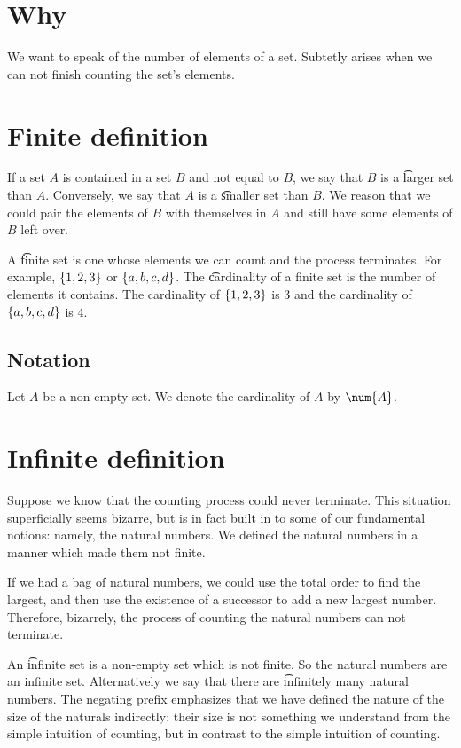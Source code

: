 

\section*{Why}

We want to speak of the number of elements of a set.
Subtetly arises when we can not finish counting the set's elements.

\section*{Finite definition}

If a set $A$ is contained in a set $B$ and not equal to $B$,
we say that $B$ is a \t{larger set} than $A$.
Conversely, we say that $A$ is a \t{smaller set} than $B$.
We reason that we could pair the elements of $B$ with themselves
in $A$ and still have some elements of $B$ left over.

A \t{finite set} is one whose elements we can count and the process terminates.
For example, $\{1, 2, 3\}$ or $\{a,b,c,d\}$.
The \t{cardinality} of a finite set is the number of elements it contains.
The cardinality of $\{1, 2, 3\}$ is 3 and the cardinality of $\{a,b,c,d\}$ is 4.

\subsection*{Notation}

Let $A$ be a non-empty set.
We denote the cardinality of $A$ by $\num{A}$.

\section*{Infinite definition}

Suppose we know that the counting process could never terminate.
This situation superficially seems bizarre, but is in fact built in to some of our fundamental notions: namely, the natural numbers.
We defined the natural numbers in a manner which made them not finite.

If we had a bag of natural numbers, we could use the total order
to find the largest, and then use the existence of a successor to
add a new largest number.
Therefore, bizarrely, the process of counting the natural numbers
can not terminate.

An \t{infinite set} is a non-empty set which is not finite.
So the natural numbers are an infinite set.
Alternatively we say that there are \t{infinitely many} natural numbers.
The negating prefix  emphasizes that we have defined
the nature of the size of the naturals indirectly: their size
is not something we understand from the simple intuition of
counting, but in contrast to the simple intuition of counting.

